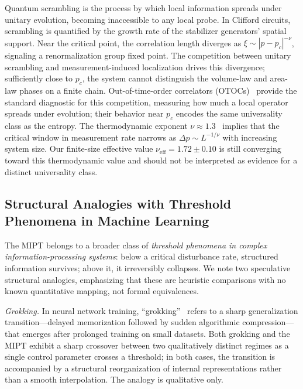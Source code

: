 \documentclass[twocolumn,prl,aps,floatfix]{revtex4-2}
\begin{document}
Quantum scrambling is the process by which local information spreads under unitary
evolution, becoming inaccessible to any local probe.
In Clifford circuits, scrambling is quantified by the growth rate of the stabilizer
generators' spatial support.
Near the critical point, the correlation length diverges as $\xi \sim |p - p_c|^{-\nu}$,
signaling a renormalization group fixed point.
The competition between unitary scrambling and measurement-induced localization
drives this divergence; sufficiently close to $p_c$, the system cannot distinguish
the volume-law and area-law phases on a finite chain.
Out-of-time-order correlators (OTOCs)~\cite{Li2019} provide the standard diagnostic
for this competition, measuring how much a local operator spreads under evolution;
their behavior near $p_c$ encodes the same universality class as the entropy.
The thermodynamic exponent $\nu \approx 1.3$~\cite{Zabalo2020} implies that the
critical window in measurement rate narrows as $\Delta p \sim L^{-1/\nu}$
with increasing system size.
Our finite-size effective value $\nu_{\mathrm{eff}} = 1.72 \pm 0.10$ is still
converging toward this thermodynamic value and should not be interpreted as
evidence for a distinct universality class.

\subsection{Structural Analogies with Threshold Phenomena in Machine Learning}
\label{sec:aianalogy}

The MIPT belongs to a broader class of \textit{threshold phenomena in complex
information-processing systems}: below a critical disturbance rate, structured
information survives; above it, it irreversibly collapses.
We note two speculative structural analogies, emphasizing that these are
heuristic comparisons with no known quantitative mapping, not formal equivalences.

\textit{Grokking.}
In neural network training, ``grokking''~\cite{Power2022} refers to a sharp
generalization transition---delayed memorization followed by sudden algorithmic
compression---that emerges after prolonged training on small datasets.
Both grokking and the MIPT exhibit a sharp crossover between two qualitatively
distinct regimes as a single control parameter crosses a threshold;
in both cases, the transition is accompanied by a structural reorganization of
internal representations rather than a smooth interpolation.
The analogy is qualitative only.
\end{document}
